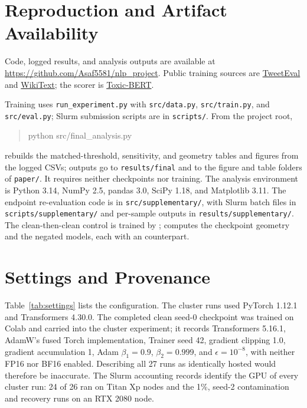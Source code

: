 \documentclass[11pt,a4paper]{article}
\newcommand{\repourl}{\url{https://github.com/Asaf5581/nlp_project}}
\begin{document}


\clearpage
\appendix
\section{Reproduction and Artifact Availability}
\label{app:repro}
Code, logged results, and analysis outputs are available at \repourl. Public training sources are \href{https://huggingface.co/datasets/cardiffnlp/tweet_eval}{TweetEval} and \href{https://huggingface.co/datasets/Salesforce/wikitext}{WikiText}; the scorer is \href{https://huggingface.co/unitary/toxic-bert}{Toxic-BERT}.

Training uses \texttt{run\_experiment.py} with \texttt{src/data.py}, \texttt{src/train.py}, and \texttt{src/eval.py}; Slurm submission scripts are in \texttt{scripts/}. From the project root,
\begin{quote}\small\ttfamily
python src/final\_analysis.py
\end{quote}
rebuilds the matched-threshold, sensitivity, and geometry tables and figures from the logged CSVs; outputs go to \texttt{results/final} and to the figure and table folders of \texttt{paper/}. It requires neither checkpoints nor training. The analysis environment is Python 3.14, NumPy 2.5, pandas 3.0, SciPy 1.18, and Matplotlib 3.11. The endpoint re-evaluation code is in \texttt{src/supplementary/}, with Slurm batch files in \texttt{scripts/supplementary/} and per-sample outputs in \texttt{results/supplementary/}. The clean-then-clean control is trained by ;  computes the checkpoint geometry and  the negated models, each with an  counterpart.

\section{Settings and Provenance}
\label{app:settings}
Table~\ref{tab:settings} lists the configuration. The cluster runs used PyTorch 1.12.1 and Transformers 4.30.0. The completed clean seed-0 checkpoint was trained on Colab and carried into the cluster experiment; it records Transformers 5.16.1, AdamW's fused Torch implementation, Trainer seed 42, gradient clipping 1.0, gradient accumulation 1, Adam $\beta_1=0.9$, $\beta_2=0.999$, and $\epsilon=10^{-8}$, with neither FP16 nor BF16 enabled. Describing all 27 runs as identically hosted would therefore be inaccurate. The Slurm accounting records identify the GPU of every cluster run: 24 of 26 ran on Titan Xp nodes and the 1\%, seed-2 contamination and recovery runs on an RTX 2080 node.
\end{document}
